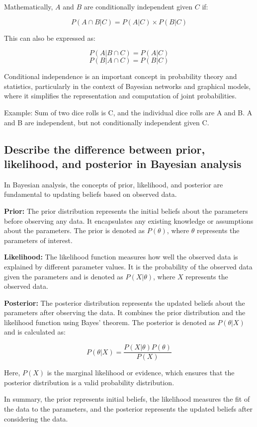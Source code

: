 \documentclass[12pt]{article}
\begin{document}
Mathematically, \(A\) and \(B\) are conditionally independent given \(C\) if:

\[ P(A \cap B | C) = P(A | C) \times P(B | C) \]

This can also be expressed as:

\[ P(A | B \cap C) = P(A | C) \]
\[ P(B | A \cap C) = P(B | C) \]

Conditional independence is an important concept in probability theory and statistics, particularly in the context of Bayesian networks and graphical models, where it simplifies the representation and computation of joint probabilities.

Example: Sum of two dice rolls is C, and the individual dice rolls are A and B. A and B are independent, but not conditionally independent given C.

\subsection{Describe the difference between prior, likelihood, and posterior in Bayesian analysis}
In Bayesian analysis, the concepts of prior, likelihood, and posterior are fundamental to updating beliefs based on observed data.

\textbf{Prior:} The prior distribution represents the initial beliefs about the parameters before observing any data. It encapsulates any existing knowledge or assumptions about the parameters. The prior is denoted as \(P(\theta)\), where \(\theta\) represents the parameters of interest.

\textbf{Likelihood:} The likelihood function measures how well the observed data is explained by different parameter values. It is the probability of the observed data given the parameters and is denoted as \(P(X|\theta)\), where \(X\) represents the observed data.

\textbf{Posterior:} The posterior distribution represents the updated beliefs about the parameters after observing the data. It combines the prior distribution and the likelihood function using Bayes' theorem. The posterior is denoted as \(P(\theta|X)\) and is calculated as:

\[ P(\theta|X) = \frac{P(X|\theta) P(\theta)}{P(X)} \]

Here, \(P(X)\) is the marginal likelihood or evidence, which ensures that the posterior distribution is a valid probability distribution.

In summary, the prior represents initial beliefs, the likelihood measures the fit of the data to the parameters, and the posterior represents the updated beliefs after considering the data.
\end{document}
